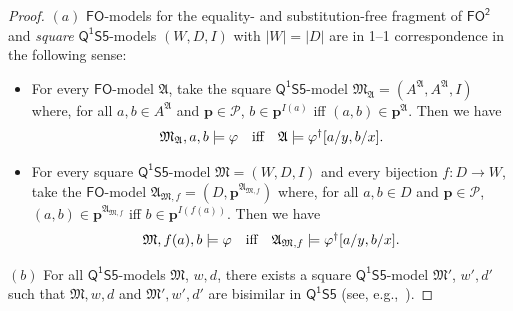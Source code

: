 \documentclass{lmcs} %
\theoremstyle{plain}\newtheorem{satz}[thm]{Satz} %
\newcommand{\FO}{\ensuremath{\mathsf{FO}}}
\newcommand{\FOT}{\ensuremath{\mathsf{FO^2}}}
\newcommand{\FOMS}{\ensuremath{\mathsf{Q^1S5}}}
\newcommand{\bs}{\boldsymbol{\beta}}
\newcommand{\fform}[1]{\boldsymbol{#1}}
\newcommand{\pvar}{\fform{p}}
\newcommand{\varset}{\mathcal{P}}
\begin{document}
\begin{appendix}
\begin{proof}
$(a)$ \FO-models for the
equality- and substitution-free fragment of \FOT{} and \emph{square} \FOMS-models $(W,D,I)$ with $|W|=|D|$ are in 1--1 correspondence in the following sense:
%
\begin{itemize}
\item[--]
 For every \FO-model $\mathfrak A$, take the square
 \FOMS-model $\mathfrak M_\mathfrak A=(A^\mathfrak A,A^\mathfrak A,I)$ where, for all $a,b\in A^\mathfrak A$ and $\pvar\in\varset$, $b\in\pvar^{I(a)}$ iff $(a,b)\in\pvar^\mathfrak A$. 
 Then we have
 \[
\mbox{$\mathfrak M_\mathfrak A,a,b\models\varphi$\quad iff\quad $\mathfrak A\models\varphi^\dag[a/y,b/x]$.}
\]
 
 \item[--]
 For every square \FOMS-model $\mathfrak M=(W,D,I)$ and every bijection $f\colon D\to W$, take
 the \FO-model $\mathfrak A_{\mathfrak M,f}=(D,\pvar^{\mathfrak A_{\mathfrak M,f}})$ where, for all $a,b\in D$ and $\pvar\in\varset$, $(a,b)\in\pvar^{\mathfrak A_{\mathfrak M,f}}$ iff $b\in\pvar^{I(f(a))}$.
 Then we have
 \begin{equation}
 \label{sqm}
 \mbox{$\mathfrak M,f(a),b\models\varphi$\quad iff\quad $\mathfrak A_{\mathfrak M,f}\models\varphi^\dag[a/y,b/x]$.}
\end{equation}
%
\end{itemize}

$(b)$ For all \FOMS-models $\mathfrak M$, $w,d$, there exists a square
\FOMS-model $\mathfrak M'$, $w',d'$  such that 
$\mathfrak M,w,d$ and $\mathfrak M',w',d'$ are bisimilar in \FOMS{}
(see, e.g.,~\cite[Prop.3.12]{GabEtAl03}).
%
\end{proof}


\end{appendix}
\end{document}
